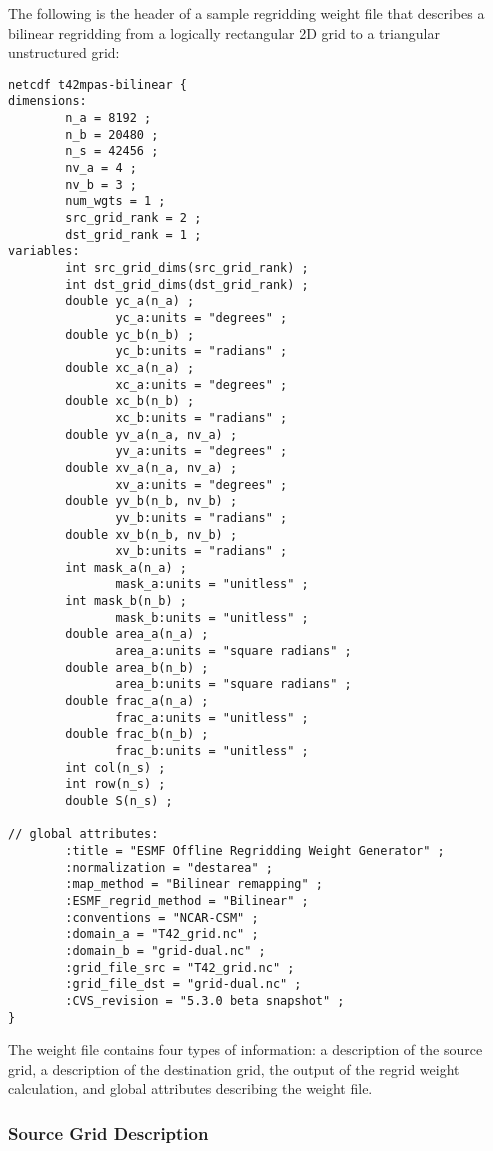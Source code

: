 The following is the header of a sample regridding weight file that describes a bilinear regridding 
from a logically rectangular 2D grid to a triangular unstructured grid:

\begin{verbatim}
netcdf t42mpas-bilinear {
dimensions:
        n_a = 8192 ;
        n_b = 20480 ;
        n_s = 42456 ;
        nv_a = 4 ;
        nv_b = 3 ;
        num_wgts = 1 ;
        src_grid_rank = 2 ;
        dst_grid_rank = 1 ;
variables:
        int src_grid_dims(src_grid_rank) ;
        int dst_grid_dims(dst_grid_rank) ;
        double yc_a(n_a) ;
               yc_a:units = "degrees" ;
        double yc_b(n_b) ;
               yc_b:units = "radians" ;
        double xc_a(n_a) ;
               xc_a:units = "degrees" ;
        double xc_b(n_b) ;
               xc_b:units = "radians" ;
        double yv_a(n_a, nv_a) ;
               yv_a:units = "degrees" ;
        double xv_a(n_a, nv_a) ;
               xv_a:units = "degrees" ;
        double yv_b(n_b, nv_b) ;
               yv_b:units = "radians" ;
        double xv_b(n_b, nv_b) ;
               xv_b:units = "radians" ;
        int mask_a(n_a) ;
               mask_a:units = "unitless" ;
        int mask_b(n_b) ;
               mask_b:units = "unitless" ;
        double area_a(n_a) ;
               area_a:units = "square radians" ;
        double area_b(n_b) ;
               area_b:units = "square radians" ;
        double frac_a(n_a) ;
               frac_a:units = "unitless" ;
        double frac_b(n_b) ;
               frac_b:units = "unitless" ;
        int col(n_s) ;
        int row(n_s) ;
        double S(n_s) ;
 
// global attributes:
        :title = "ESMF Offline Regridding Weight Generator" ;
        :normalization = "destarea" ;
        :map_method = "Bilinear remapping" ;
        :ESMF_regrid_method = "Bilinear" ;
        :conventions = "NCAR-CSM" ;
        :domain_a = "T42_grid.nc" ;
        :domain_b = "grid-dual.nc" ;
        :grid_file_src = "T42_grid.nc" ;
        :grid_file_dst = "grid-dual.nc" ;
        :CVS_revision = "5.3.0 beta snapshot" ;
}
\end{verbatim}

 The weight file contains four types of information: a description of the source grid, a description of the destination grid, the output of the regrid weight calculation, and global attributes describing the weight file. 

\subsubsection{Source Grid Description}

